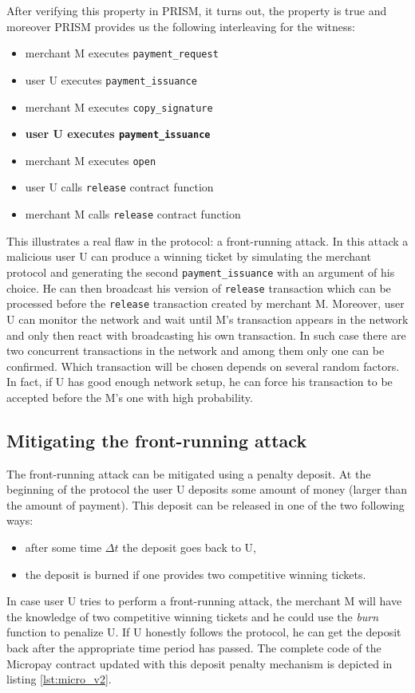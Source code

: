 After verifying this property in PRISM, it turns out, the property is true and moreover PRISM provides us the 
following interleaving for the witness:
\begin{itemize}
\item merchant M executes \lstinline{payment_request}
\item user U executes \lstinline{payment_issuance}
\item merchant M executes \lstinline{copy_signature}
\item \textbf{user U executes \lstinline{payment_issuance}}
\item merchant M executes \lstinline{open}
\item user U calls \lstinline{release} contract function
\item merchant M calls \lstinline{release} contract function
\end{itemize}
This illustrates a real flaw in the protocol: a front-running attack.
In this attack a malicious user U can produce a winning ticket by simulating
the merchant protocol and generating the second \lstinline{payment_issuance} with an argument of his choice.
He can then broadcast his version of \lstinline{release} transaction which can be processed 
before the \lstinline{release} transaction created by merchant M.
Moreover, user U can monitor the network and wait until M's transaction appears in the network and only then
react with broadcasting his own transaction.
In such case there are two concurrent transactions in the network and among them only one can be confirmed.
Which transaction will be chosen depends on several random factors.
In fact, if U has good enough network setup, he can force his transaction to be accepted before the M's one
with high probability.

\subsection{Mitigating the front-running attack}

The front-running attack can be mitigated using a penalty deposit.
At the beginning of the protocol the user U deposits some amount of money (larger than the amount of payment).
This deposit can be released in one of the two following ways:
\begin{itemize}
\item after some time $\Delta t$ the deposit goes back to U,
\item the deposit is burned if one provides two competitive winning tickets.
\end{itemize}
In case user U tries to perform a front-running attack, the merchant M will have the knowledge of two 
competitive winning tickets and he could use the \emph{burn} function to penalize U.
If U honestly follows the protocol, he can get the deposit back after the appropriate time period has passed.
The complete code of the Micropay contract updated with this deposit penalty mechanism is depicted in listing
\ref{lst:micro_v2}.

